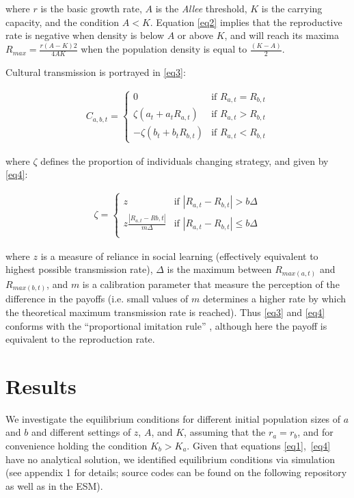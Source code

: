 \documentclass[preprint,authoryear]{elsarticle}
\begin{document}
where $r$ is the basic growth rate, $A$ is the \emph{Allee} threshold,  $K$ is the carrying capacity, and the condition $A < K$. Equation \eqref{eq2} implies that the reproductive rate is negative when density is below $A$ or above $K$, and will reach its maxima $R_{max}=\frac{r(A-K)2}{4AK}$ when the population density is equal to $\frac{(K-A)}{2}$. 

Cultural transmission is portrayed in \eqref{eq3}:

\begin{align}
\label{eq3}
C_{a,b,t} = 
\begin{cases}
0& \text{if } R_{a,t} = R_{b,t}\\
\zeta(a_t+a_tR_{a,t})& \text{if } R_{a,t} > R_{b,t}\\
-\zeta(b_t+b_tR_{b,t})& \text{if } R_{a,t} < R_{b,t}
\end{cases}
\end{align}

where $\zeta$ defines the proportion of individuals changing strategy, and given by \eqref{eq4}:

\begin{align}
\label{eq4}
\zeta = 
\begin{cases}
z& \text{if }|R_{a,t}-R_{b,t}| > b\Delta\\
z\frac{|R_{a,t}-R{b,t}|}{m\Delta}& \text{if }|R_{a,t}-R_{b,t}| \leq b\Delta\\
\end{cases}
\end{align}

where $z$ is a measure of reliance in social learning (effectively equivalent to highest possible transmission rate),  $\Delta$ is the maximum between $R_{max(a,t)}$ and $R_{max(b,t)}$, and $m$ is a calibration parameter that measure the perception of the difference in the payoffs (i.e. small values of $m$ determines a higher rate by which the theoretical maximum transmission rate is reached). Thus \eqref{eq3} and \eqref{eq4}  conforms with the ``proportional imitation rule''  \citep{schlag1998}, although here the payoff is equivalent to the reproduction rate. 

\section{Results}

We investigate the equilibrium conditions for different initial population sizes of  $a$ and $b$ and different settings of $z$, $A$, and $K$, assuming that the $r_a=r_b$, and for convenience holding the condition $K_b>K_a$. Given that equations \ref{eq1},~\ref{eq4} have no analytical solution, we identified equilibrium conditions via simulation (see appendix 1 for details; source codes can be found on the following repository %
as well as in the ESM).  
\end{document}
